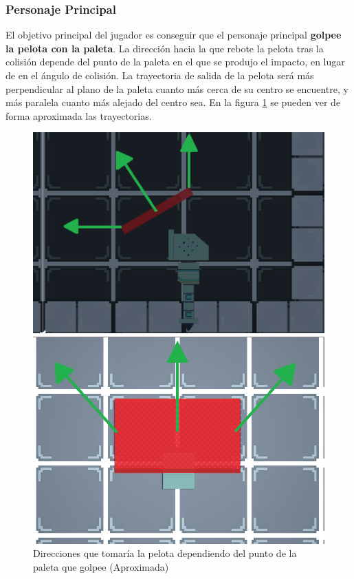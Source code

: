 \subsubsection{Personaje Principal}
El objetivo principal del jugador es conseguir que el personaje principal \textbf{golpee la pelota con la paleta}. La dirección hacia la que rebote la pelota tras la colisión depende del punto de la paleta en el que se produjo el impacto, en lugar de en el ángulo de colisión. La trayectoria de salida de la pelota será más perpendicular al plano de la paleta cuanto más cerca de su centro se encuentre, y más paralela cuanto más alejado del centro sea. En la figura \ref{paddle_direction} se pueden ver de forma aproximada las trayectorias.
\begin{figure}[!htb]
   \begin{minipage}{0.5\textwidth}
     \centering
     \includegraphics[width=0.9\linewidth, right]{images/estructura/fisica/paddle_direction_side}
   \end{minipage}\hfill
   \begin {minipage}{0.5\textwidth}
     \centering
     \includegraphics[width=0.9\linewidth, left]{images/estructura/fisica/paddle_direction_top}
   \end{minipage}
   \caption{Direcciones que tomaría la pelota dependiendo del punto de la paleta que golpee (Aproximada)}
   \label{paddle_direction}
\end{figure}

